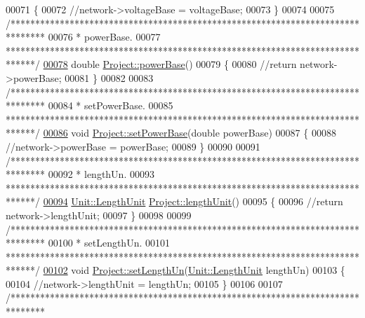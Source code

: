 \begin{DoxyCode}
00071 \{
00072   \textcolor{comment}{//network->voltageBase = voltageBase;}
00073 \}
00074 
00075 \textcolor{comment}{/*******************************************************************************}
00076 \textcolor{comment}{ * powerBase.}
00077 \textcolor{comment}{ ******************************************************************************/}
\hypertarget{project_8cpp_source_l00078}{}\hyperlink{class_project_a1a417c6832182389fb501b92cade3f9d}{00078} \textcolor{keywordtype}{double} \hyperlink{class_project_a1a417c6832182389fb501b92cade3f9d}{Project::powerBase}()
00079 \{
00080   \textcolor{comment}{//return network->powerBase;}
00081 \}
00082 
00083 \textcolor{comment}{/*******************************************************************************}
00084 \textcolor{comment}{ * setPowerBase.}
00085 \textcolor{comment}{ ******************************************************************************/}
\hypertarget{project_8cpp_source_l00086}{}\hyperlink{class_project_abb4df805b3cd3af509a41e657eb4bb83}{00086} \textcolor{keywordtype}{void} \hyperlink{class_project_abb4df805b3cd3af509a41e657eb4bb83}{Project::setPowerBase}(\textcolor{keywordtype}{double} powerBase)
00087 \{
00088   \textcolor{comment}{//network->powerBase = powerBase;}
00089 \}
00090 
00091 \textcolor{comment}{/*******************************************************************************}
00092 \textcolor{comment}{ * lengthUn.}
00093 \textcolor{comment}{ ******************************************************************************/}
\hypertarget{project_8cpp_source_l00094}{}\hyperlink{class_project_a40cd2f59a4a708897e5997942c046f4d}{00094} \hyperlink{class_unit_a8c8921f7b225ad6063b1cb573425b9a0}{Unit::LengthUnit} \hyperlink{class_project_a40cd2f59a4a708897e5997942c046f4d}{Project::lengthUnit}()
00095 \{
00096   \textcolor{comment}{//return network->lengthUnit;}
00097 \}
00098 
00099 \textcolor{comment}{/*******************************************************************************}
00100 \textcolor{comment}{ * setLengthUn.}
00101 \textcolor{comment}{ ******************************************************************************/}
\hypertarget{project_8cpp_source_l00102}{}\hyperlink{class_project_a846ee2284b0856d461b35d78d9f8e1d6}{00102} \textcolor{keywordtype}{void} \hyperlink{class_project_a846ee2284b0856d461b35d78d9f8e1d6}{Project::setLengthUn}(\hyperlink{class_unit_a8c8921f7b225ad6063b1cb573425b9a0}{Unit::LengthUnit} lengthUn)
00103 \{
00104   \textcolor{comment}{//network->lengthUnit = lengthUn;}
00105 \}
00106 
00107 \textcolor{comment}{/*******************************************************************************}

\end{DoxyCode}
